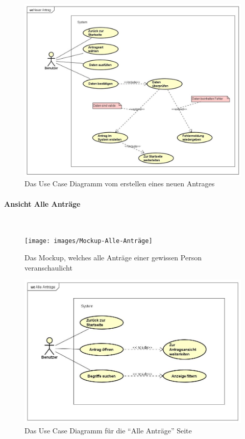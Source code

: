 \begin{figure}[H]
	\centering
	\includegraphics[width=1\linewidth]{images/uc-new}
	\caption[Use Case Diagramm Neuer Antrag]{Das Use Case Diagramm vom erstellen eines neuen Antrages}
	\label{fig:ucStart}
\end{figure}
\paragraph{Ansicht Alle Anträge}
~\\

\begin{figure}[H]
	\centering
	\texttt{[image: images/Mockup-Alle-Anträge]}
	\caption[Mockup Alle Anträge]{Das Mockup, welches alle Anträge einer gewissen Person veranschaulicht}
	\label{fig:mockupAlle}
\end{figure}
\begin{figure}[H]
	\centering
	\includegraphics[width=1\linewidth]{images/uc-all}
	\caption[Use Case Diagramm Alle Anträge]{Das Use Case Diagramm für die \enquote{Alle Anträge} Seite}
	\label{fig:ucAll}
\end{figure}
